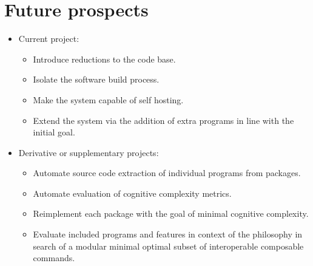 \section{Future prospects}\label{Future prospects}

\begin{itemize}
    \item Current project:
    \begin{itemize}
        \item Introduce reductions to the code base.
        \item Isolate the software build process.
        \item Make the system capable of self hosting.
        \item Extend the system via the addition of extra programs in line with the initial goal.
    \end{itemize}
    \item Derivative or supplementary projects:
    \begin{itemize}
        \item Automate source code extraction of individual programs from packages.
        \item Automate evaluation of cognitive complexity metrics.
        \item Reimplement each package with the goal of minimal cognitive complexity.
        \item Evaluate included programs and features in context of the  philosophy in search of a modular minimal optimal subset of interoperable composable commands.
    \end{itemize}
\end{itemize}
